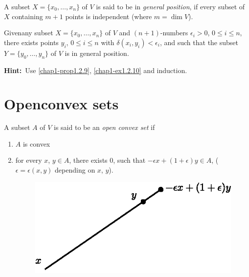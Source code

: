 \begin{ex}\label{chap1-ex1.2.11}
A subset $X=\{x_{0},\ldots,x_{n}\}$ of $V$ is said to be in {\em general position}, if every subset of $X$ containing $m+1$ points is independent (where $m=\dim V$).
\end{ex}

\begin{ex}\label{chap1-ex1.2.12}
Given\pageoriginale any subset $X=\{x_{0},\ldots,x_{n}\}$ of $V$ and $(n+1)$-numbers $\epsilon_{i}>0$, $0\leq i\leq n$, there exists points $y_{i}$, $0\leq i\leq n$ with $\delta(x_{i},y_{i})<\epsilon_{i}$, and such that the subset $Y=\{y_{0},\ldots,y_{n}\}$ of $V$ is in general position.
\end{ex}

\noindent
{\bf Hint:}~Use \ref{chap1-prop1.2.9}, \ref{chap1-ex1.2.10} and induction. 

\section{Openconvex sets}\label{chap1-sec1.3}

\begin{definition}\label{chap1-defi1.3.1}
A subset $A$ of $V$ is said to be an {\em open convex set} if
\begin{enumerate}
\renewcommand{\labelenumi}{(\theenumi)}
\item $A$ is convex

\item for every $x$, $y\in A$, there exists $0$, such that $-\epsilon x+(1+\epsilon)y\in A$, ($\epsilon =\epsilon(x,y)$ depending on $x$, $y$).
\begin{figure}[H]
\centering
\includegraphics{figure/fig1.eps}
\end{figure}
\end{enumerate}
\end{definition}

